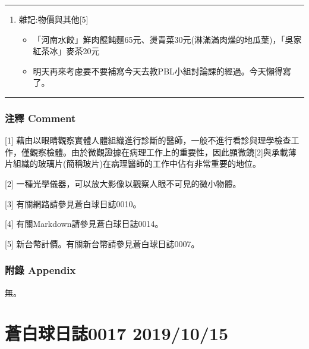 \documentclass[
]{article}
\providecommand{\tightlist}{%
  \setlength{\itemsep}{0pt}\setlength{\parskip}{0pt}}
\begin{document}
\begin{center}\rule{0.5\linewidth}{\linethickness}\end{center}

\begin{enumerate}
\def\labelenumi{\arabic{enumi}.}
\setcounter{enumi}{2}
\item
  雜記:物價與其他{[}5{]}

  \begin{itemize}
  \tightlist
  \item
    「河南水餃」鮮肉餛飩麵65元、燙青菜30元(淋滿滿肉燥的地瓜葉)，「吳家紅茶冰」麥茶20元
  \item
    明天再來考慮要不要補寫今天去教PBL小組討論課的經過。今天懶得寫了。
  \end{itemize}
\end{enumerate}

\begin{center}\rule{0.5\linewidth}{\linethickness}\end{center}

\hypertarget{ux6ce8ux91cb-comment-9}{%
\subsubsection{注釋 Comment}\label{ux6ce8ux91cb-comment-9}}

{[}1{]}
藉由以眼睛觀察實體人體組織進行診斷的醫師，一般不進行看診與理學檢查工作，僅觀察檢體。由於微觀證據在病理工作上的重要性，因此顯微鏡{[}2{]}與承載薄片組織的玻璃片(簡稱玻片)在病理醫師的工作中佔有非常重要的地位。

{[}2{]} 一種光學儀器，可以放大影像以觀察人眼不可見的微小物體。

{[}3{]} 有關網路請參見蒼白球日誌0010。

{[}4{]} 有關Markdown請參見蒼白球日誌0014。

{[}5{]} 新台幣計價。有關新台幣請參見蒼白球日誌0007。

\hypertarget{ux9644ux9304-appendix-8}{%
\subsubsection{附錄 Appendix}\label{ux9644ux9304-appendix-8}}

無。

\hypertarget{ux84bcux767dux7403ux65e5ux8a8c0017-20191015}{%
\section{蒼白球日誌0017
2019/10/15}\label{ux84bcux767dux7403ux65e5ux8a8c0017-20191015}}
\end{document}
